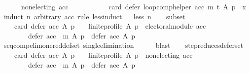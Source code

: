 \begin{isabellebody}
\ \ \ \ \ \ non{\isacharunderscore}{\kern0pt}electing\ acc{\isacharparenright}{\kern0pt}\ {\isasymlongrightarrow}\isanewline
\ \ \ \ \ \ \ \ \ \ card\ {\isacharparenleft}{\kern0pt}defer\ {\isacharparenleft}{\kern0pt}loop{\isacharunderscore}{\kern0pt}comp{\isacharunderscore}{\kern0pt}helper\ acc\ m\ t{\isacharparenright}{\kern0pt}\ A\ p{\isacharparenright}{\kern0pt}\ {\isacharequal}{\kern0pt}\ x{\isachardoublequoteclose}\isanewline
%
\isadelimproof
%
\endisadelimproof
%
\isatagproof
{}\isamarkupfalse%
\ {\isacharparenleft}{\kern0pt}induct\ n\ arbitrary{\isacharcolon}{\kern0pt}\ acc\ rule{\isacharcolon}{\kern0pt}\ less{\isacharunderscore}{\kern0pt}induct{\isacharparenright}{\kern0pt}\isanewline
\ \ \isamarkupfalse%
{\isacharparenleft}{\kern0pt}less\ n{\isacharparenright}{\kern0pt}\isanewline
\ \ \isamarkupfalse%
\ subset{\isacharcolon}{\kern0pt}\isanewline
\ \ \ \ {\isachardoublequoteopen}{\isacharparenleft}{\kern0pt}card\ {\isacharparenleft}{\kern0pt}defer\ acc\ A\ p{\isacharparenright}{\kern0pt}\ {\isachargreater}{\kern0pt}\ {}\ {\isasymand}\ finite{\isacharunderscore}{\kern0pt}profile\ A\ p\ {\isasymand}\ electoral{\isacharunderscore}{\kern0pt}module\ acc{\isacharparenright}{\kern0pt}\ {\isasymlongrightarrow}\isanewline
\ \ \ \ \ \ \ \ defer\ {\isacharparenleft}{\kern0pt}acc\ {\isasymtriangleright}\ m{\isacharparenright}{\kern0pt}\ A\ p\ {\isasymsubset}\ defer\ acc\ A\ p{\isachardoublequoteclose}\isanewline
\ \ \ \ \isamarkupfalse%
\ seq{\isacharunderscore}{\kern0pt}comp{\isacharunderscore}{\kern0pt}elim{\isacharunderscore}{\kern0pt}one{\isacharunderscore}{\kern0pt}red{\isacharunderscore}{\kern0pt}def{\isacharunderscore}{\kern0pt}set\ single{\isacharunderscore}{\kern0pt}elimination\isanewline
\ \ \ \ \isamarkupfalse%
\ blast\isanewline
\ \ \isamarkupfalse%
\ step{\isacharunderscore}{\kern0pt}reduces{\isacharunderscore}{\kern0pt}defer{\isacharunderscore}{\kern0pt}set{\isacharcolon}{\kern0pt}\isanewline
\ \ \ \ {\isachardoublequoteopen}{\isacharparenleft}{\kern0pt}card\ {\isacharparenleft}{\kern0pt}defer\ acc\ A\ p{\isacharparenright}{\kern0pt}\ {\isachargreater}{\kern0pt}\ {}\ {\isasymand}\ finite{\isacharunderscore}{\kern0pt}profile\ A\ p\ {\isasymand}\ non{\isacharunderscore}{\kern0pt}electing\ acc{\isacharparenright}{\kern0pt}\ {\isasymlongrightarrow}\isanewline
\ \ \ \ \ \ \ \ defer\ {\isacharparenleft}{\kern0pt}acc\ {\isasymtriangleright}\ m{\isacharparenright}{\kern0pt}\ A\ p\ {\isasymsubset}\ defer\ acc\ A\ p{\isachardoublequoteclose}\isanewline

\end{isabellebody}
